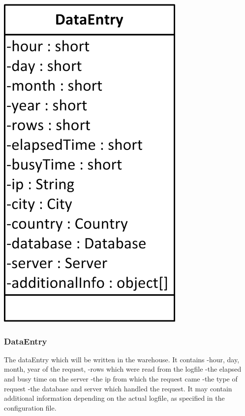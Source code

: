 \begin{center}
\includegraphics{Pictures/Parts/DataEntry.png}
\end{center}  

\subsubsection*{DataEntry}
The dataEntry which will be written in the warehouse.
It contains 
-hour, day, month, year of the request,
-rows which were read  from the logfile%
-the elapsed and busy time on the server
-the ip from which the request came
-the type of request
-the database and server which handled the request. %
It may contain additional information depending on the actual logfile, as specified in the configuration file. %


